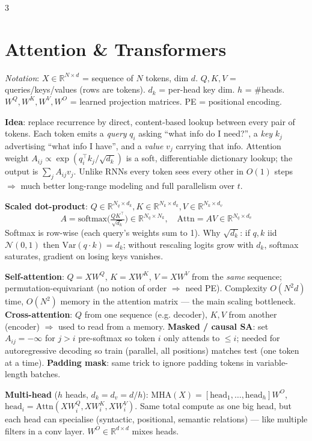 \documentclass[a4paper,9pt,landscape]{scrartcl}
\newcommand{\R}{\mathbb{R}}
\newcommand{\softmax}{\mathrm{softmax}}
\begin{document}
\begin{multicols*}{3}
\section{Attention \& Transformers}
\textit{Notation}: $X\!\in\!\R^{N\times d}$ = sequence of $N$ tokens, dim $d$. $Q,K,V$ = queries/keys/values (rows are tokens). $d_k$ = per-head key dim. $h$ = \#heads. $W^Q,W^K,W^V,W^O$ = learned projection matrices. PE = positional encoding.

\textbf{Idea}: replace recurrence by direct, content-based lookup between every pair of tokens. Each token emits a \emph{query} $q_i$ asking ``what info do I need?'', a \emph{key} $k_j$ advertising ``what info I have'', and a \emph{value} $v_j$ carrying that info. Attention weight $A_{ij}{\propto}\exp(q_i^\top k_j/\sqrt{d_k})$ is a soft, differentiable dictionary lookup; the output is $\sum_j A_{ij}v_j$. Unlike RNNs every token sees every other in $O(1)$ steps $\Rightarrow$ much better long-range modeling and full parallelism over $t$.

\textbf{Scaled dot-product}: $Q\!\in\!\R^{N_q\times d_k},K\!\in\!\R^{N_k\times d_k},V\!\in\!\R^{N_k\times d_v}$
$$A=\softmax\!\Big(\!\tfrac{QK^\top}{\sqrt{d_k}}\!\Big)\in\R^{N_q\times N_k},\quad \mathrm{Attn}=AV\in\R^{N_q\times d_v}$$
Softmax is row-wise (each query's weights sum to 1). Why $\sqrt{d_k}$: if $q,k$ iid $\mathcal N(0,1)$ then $\mathrm{Var}(q\!\cdot\!k){=}d_k$; without rescaling logits grow with $d_k$, softmax saturates, gradient on losing keys vanishes.

\textbf{Self-attention}: $Q{=}XW^Q$, $K{=}XW^K$, $V{=}XW^V$ from the \emph{same} sequence; permutation-equivariant (no notion of order $\Rightarrow$ need PE). Complexity $O(N^2 d)$ time, $O(N^2)$ memory in the attention matrix — the main scaling bottleneck.
\textbf{Cross-attention}: $Q$ from one sequence (e.g. decoder), $K,V$ from another (encoder) $\Rightarrow$ used to read from a memory.
\textbf{Masked / causal SA}: set $A_{ij}{=}-\infty$ for $j>i$ pre-softmax so token $i$ only attends to $\le i$; needed for autoregressive decoding so train (parallel, all positions) matches test (one token at a time).
\textbf{Padding mask}: same trick to ignore padding tokens in variable-length batches.

\textbf{Multi-head} ($h$ heads, $d_k{=}d_v{=}d/h$):
$\mathrm{MHA}(X)=[\mathrm{head}_1,\dots,\mathrm{head}_h]W^O$, $\mathrm{head}_i=\mathrm{Attn}(XW^Q_i,XW^K_i,XW^V_i)$.
Same total compute as one big head, but each head can specialise (syntactic, positional, semantic relations) — like multiple filters in a conv layer. $W^O\!\in\!\R^{d\times d}$ mixes heads.


\end{multicols*}
\end{document}
